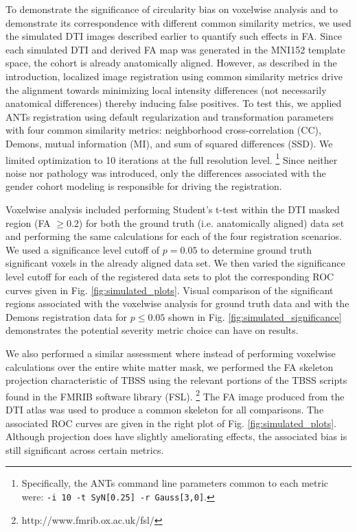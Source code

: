 \documentclass[final,5p,times,twocolumn]{elsarticle}
\begin{document}
To demonstrate the significance of circularity bias on voxelwise 
analysis and to demonstrate its correspondence with different
common similarity metrics, we used the simulated DTI images 
described earlier to quantify such effects in FA.
Since each simulated DTI and derived FA map was generated in the
MNI152 template space, the cohort is already anatomically
aligned.  However, as described in the introduction, localized
image registration using common similarity metrics drive the 
alignment towards minimizing local intensity differences (not necessarily
anatomical differences) thereby
inducing false positives.  To test this, we applied ANTs registration
using default regularization and transformation parameters with
four common similarity metrics:  neighborhood cross-correlation (CC), 
Demons, mutual information (MI), and sum of squared differences (SSD).
We limited optimization to 10 iterations at the full resolution 
level.%
\footnote{
Specifically, the ANTs command line parameters common to each metric were:
{\tt -i 10 -t SyN[0.25] -r Gauss[3,0]}.
}
Since neither noise nor pathology was introduced, only the differences
associated with the gender cohort modeling is responsible for driving
the registration.

Voxelwise analysis included performing Student's t-test within the
DTI masked region (FA $\geq 0.2$) for both the ground truth (i.e.
anatomically aligned) data set and performing the same calculations
for each of the four registration scenarios.  We used a significance
level cutoff of $p = 0.05$ to determine ground truth significant
voxels in the already aligned data set.  We then varied the 
significance level cutoff for each of the registered data sets to plot
the corresponding ROC curves given in Fig. \ref{fig:simulated_plots}.
Visual comparison of the significant regions associated with the 
voxelwise analysis for ground truth data and with the Demons registration data for
$p \leq 0.05$ shown in Fig. \ref{fig:simulated_significance} demonstrates 
the potential severity metric choice can have on results.

We also performed a similar assessment
where instead of performing voxelwise calculations over the entire
white matter mask, we performed the FA skeleton projection characteristic
of TBSS using the relevant portions of the TBSS scripts found in the 
FMRIB software library (FSL).%
\footnote{
http://www.fmrib.ox.ac.uk/fsl/
}
The FA 
image produced from the
DTI atlas was used to produce a common skeleton for all comparisons.
The associated ROC curves are given
in the right plot of Fig. \ref{fig:simulated_plots}.  Although projection
does have slightly ameliorating effects, the associated bias is still 
significant across certain metrics.  
\end{document}
